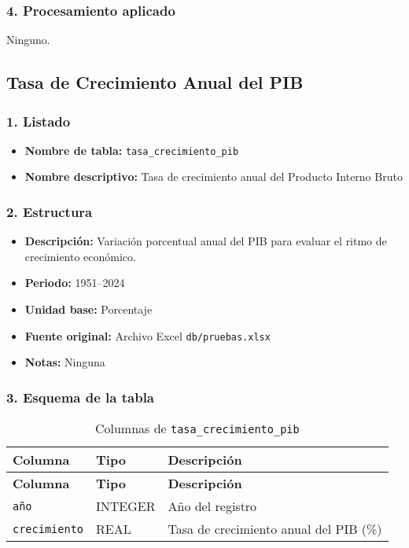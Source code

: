 \documentclass[12pt,a4paper]{article}
\begin{document}
\subsubsection*{4. Procesamiento aplicado}
Ninguno.

\newpage
\subsection{Tasa de Crecimiento Anual del PIB}

\subsubsection*{1. Listado}
\begin{itemize}
  \item \textbf{Nombre de tabla:} \texttt{tasa\_crecimiento\_pib}
  \item \textbf{Nombre descriptivo:} Tasa de crecimiento anual del Producto Interno Bruto
\end{itemize}

\subsubsection*{2. Estructura}
\begin{itemize}
  \item \textbf{Descripción:} Variación porcentual anual del PIB para evaluar el ritmo de crecimiento económico.
  \item \textbf{Periodo:} 1951--2024
  \item \textbf{Unidad base:} Porcentaje
  \item \textbf{Fuente original:} Archivo Excel \texttt{db/pruebas.xlsx}
  \item \textbf{Notas:} Ninguna
\end{itemize}

\subsubsection*{3. Esquema de la tabla}
\begin{longtable}{@{}lll@{}}
\caption{Columnas de \texttt{tasa\_crecimiento\_pib}}\\
\toprule
\textbf{Columna} & \textbf{Tipo} & \textbf{Descripción} \\
\midrule
\endfirsthead
\toprule
\textbf{Columna} & \textbf{Tipo} & \textbf{Descripción} \\
\midrule
\endhead
\bottomrule
\endfoot
\texttt{año}        & INTEGER & Año del registro \\
\texttt{crecimiento} & REAL    & Tasa de crecimiento anual del PIB (\%) \\
\end{longtable}
\end{document}
